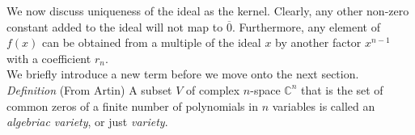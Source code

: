 We now discuss uniqueness of the ideal as the kernel.  Clearly, any other non-zero constant added to the ideal will not map to $\overline{0}$.  Furthermore, any element of $f(x)$ can be obtained from a multiple of the ideal $x$ by another factor $x^{n-1}$ with a coefficient $r_{n}$.\\ 

We briefly introduce a new term before we move onto the next section.\\

\textit{Definition} (From Artin) A subset $V$ of complex $n$-space $\mathbb{C}^{n}$ that is the set of common zeros of a finite number of polynomials in $n$ variables is called an \textit{algebriac variety}, or just \textit{variety}.\\






